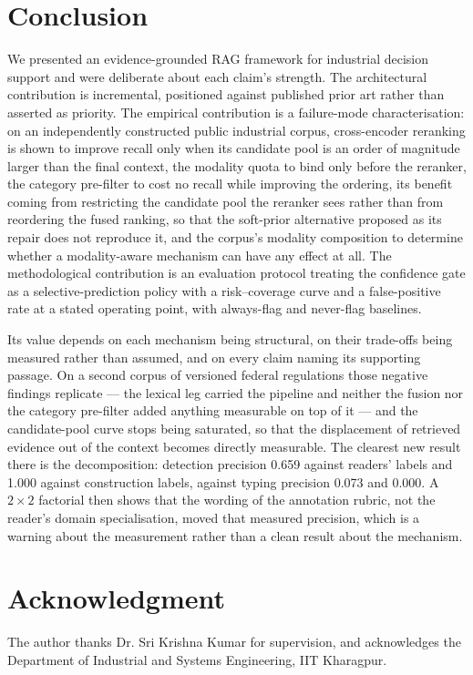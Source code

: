 \documentclass[conference]{IEEEtran}
\begin{document}
\section{Conclusion}

We presented an evidence-grounded RAG framework for industrial decision
support and were deliberate about each claim's strength. The architectural
contribution is incremental, positioned against published prior art rather than
asserted as priority. The empirical contribution is a failure-mode
characterisation: on an independently constructed public industrial corpus,
cross-encoder reranking is shown to improve recall only when its candidate
pool is an order of magnitude larger than the final context, the modality quota
to bind only before the reranker, the category pre-filter to cost no recall while improving the ordering, its benefit coming
from restricting the candidate pool the reranker sees rather than from reordering the fused
ranking, so that the soft-prior alternative proposed as its repair does not reproduce it, and the corpus's modality composition to
determine whether a modality-aware mechanism can have any effect at all. The
methodological contribution is an evaluation protocol treating the confidence
gate as a selective-prediction policy with a risk--coverage curve and a
false-positive rate at a stated operating point, with always-flag and never-flag
baselines.

Its value depends on each mechanism being structural, on their trade-offs being
measured rather than assumed, and on every claim naming its supporting passage.
On a second corpus of versioned federal regulations those negative findings
replicate --- the lexical leg carried the pipeline and neither the fusion nor
the category pre-filter added anything measurable on top of it --- and the
candidate-pool curve stops being saturated, so that the displacement of
retrieved evidence out of the context becomes directly measurable. The
clearest new result there is the decomposition: detection precision
0.659 against readers' labels and
1.000 against construction labels, against typing
precision 0.073 and 0.000. A
$2\times2$ factorial then shows that the wording of the annotation rubric,
not the reader's domain specialisation, moved that measured precision, which
is a warning about the measurement rather than a clean result about the
mechanism.

\section*{Acknowledgment}
The author thanks Dr. Sri Krishna Kumar for supervision, and acknowledges the
Department of Industrial and Systems Engineering, IIT Kharagpur.
\end{document}
